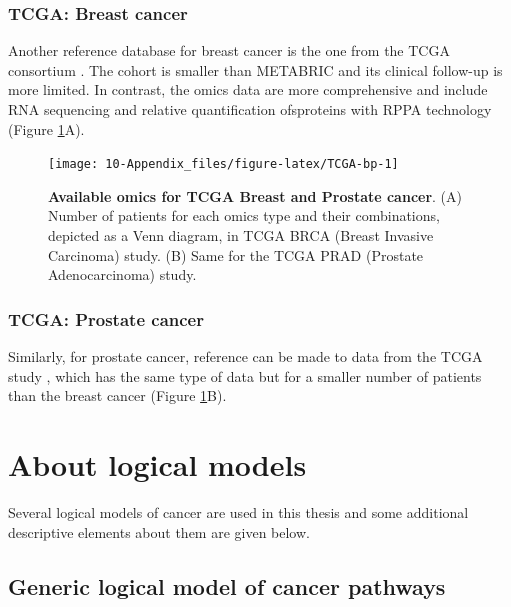 \documentclass[a4paper,12pt,twoside,onecolumn,openright,final,oldfontcommands]{memoir}
\begin{document}
\subsection{TCGA: Breast cancer}\label{tcga-breast-cancer}

Another reference database for breast cancer is the one from the TCGA
consortium \citep{cancer2012comprehensive}. The cohort is smaller than
METABRIC and its clinical follow-up is more limited. In contrast, the
omics data are more comprehensive and include RNA sequencing and
relative quantification ofsproteins with RPPA technology (Figure
\ref{fig:TCGA-bp}A).

\begin{figure}

{\centering \texttt{[image: 10-Appendix\_files/figure-latex/TCGA-bp-1]} 

}

\caption[Available omics and survival in METABRIC Breast Cancer dataset]{\textbf{Available omics for TCGA Breast and
Prostate cancer}. (A) Number of patients for each omics type and their
combinations, depicted as a Venn diagram, in TCGA BRCA (Breast Invasive
Carcinoma) study. (B) Same for the TCGA PRAD (Prostate Adenocarcinoma)
study.}\label{fig:TCGA-bp}
\end{figure}







\subsection{TCGA: Prostate cancer}\label{appendix-prostate}

Similarly, for prostate cancer, reference can be made to data from the
TCGA study \citep{abeshouse2015molecular}, which has the same type of
data but for a smaller number of patients than the breast cancer (Figure
\ref{fig:TCGA-bp}B).

\chapter{About logical models}\label{about-logical-models}

Several logical models of cancer are used in this thesis and some
additional descriptive elements about them are given below.

\section{Generic logical model of cancer pathways}\label{appendix-fumia}
\end{document}
